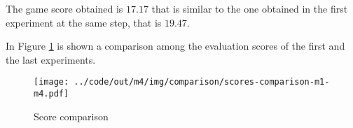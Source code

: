 \documentclass[a4paper,12pt]{article} %
\begin{document}
	The game score obtained is $17.17$ that is similar to the one obtained in the first experiment at the same step, that is $19.47$.
	
	\bigskip
	
	In Figure \ref{fig:score-m1-m4} is shown a comparison among the evaluation scores of the first and the last experiments.
	
	\begin{figure}[htb]
		\centering
		\texttt{[image: ../code/out/m4/img/comparison/scores-comparison-m1-m4.pdf]}	
		\caption{Score comparison}
		\label{fig:score-m1-m4}
	\end{figure}
	
	
\end{document}
